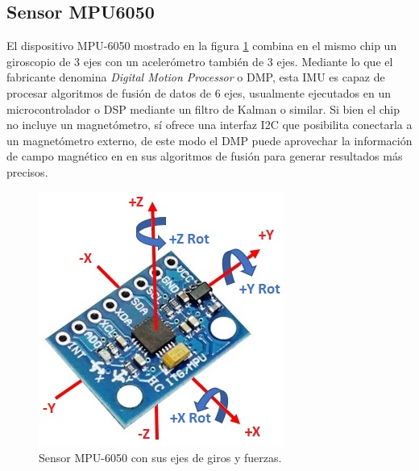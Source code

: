 
\subsection{Sensor MPU6050}\label{sec:mpu6050}

El dispositivo MPU-6050 mostrado en la figura \ref{fig:mpu6050} combina en el mismo chip un giroscopio de 3 ejes con un acelerómetro también de 3 ejes. Mediante lo que el fabricante denomina \textit{Digital Motion Processor} o DMP, esta IMU es capaz de procesar algoritmos de fusión de datos de 6 ejes, usualmente ejecutados en un microcontrolador o DSP mediante un filtro de Kalman o similar. Si bien el chip no incluye un magnetómetro, sí ofrece una interfaz I2C que posibilita conectarla a un magnetómetro externo, de este modo el DMP puede aprovechar la información de campo magnético en en sus algoritmos de fusión para generar resultados más precisos.

\begin{figure}[ht]
    \centering
    \includegraphics[scale=0.45]{./Figures/mpu6050.jpg}
    \caption{Sensor MPU-6050 con sus ejes de giros y fuerzas.}
    \label{fig:mpu6050}
\end{figure}